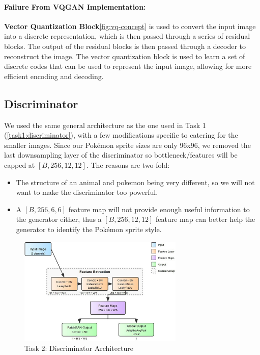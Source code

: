 \documentclass[twoside,english,notitlepage]{report}
\begin{document}
\paragraph{Failure From VQGAN Implementation:} 

\textbf{Vector Quantization Block}\ref{fig:vq-concept} is used to convert the input image into a discrete representation, which is then passed through a series of residual blocks. The output of the residual blocks is then passed through a decoder to reconstruct the image. The vector quantization block is used to learn a set of discrete codes that can be used to represent the input image, allowing for more efficient encoding and decoding. 


\subsection{Discriminator}\label{task2:discriminator}
We used the same general architecture as the one used in Task 1 (\ref{task1:discriminator}), with a few modifications specific to catering for the smaller images. Since our Pokémon sprite sizes are only 96x96, we removed the last downsampling layer of the discriminator so bottleneck/features will be capped at $[B, 256, 12, 12]$.
\noindent The reasons are two-fold: 

\begin{itemize}
    \item The structure of an animal and pokemon being very different, so we will not want to make the discriminator too powerful. 
    \item A $[B, 256, 6, 6]$ feature map will not provide enough useful information to the generator either, thus a $[B, 256, 12, 12]$ feature map can better help the generator to identify the Pokémon sprite style.
\end{itemize}


\begin{figure}[h]
    \centering
    \includegraphics[width=0.7\textwidth]{task2/discriminatorArchitecture.jpg}
    \caption{Task 2: Discriminator Architecture}
\end{figure}
\end{document}
